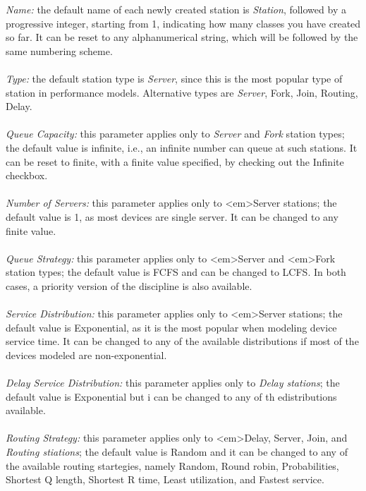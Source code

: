 \begin{description*}
\begin{center}
\end{center}
\emph{Name:}
the default name of each newly created station is \emph{Station}, followed by a progressive integer, starting from 1, indicating how many classes you have created so far. It can be reset to any alphanumerical string, which will be followed by the same numbering scheme.\\\\
\emph{Type:}
the default station type is \emph{Server}, since this is the most popular type of station in performance models. Alternative types are \emph{Server}, Fork, Join, Routing, Delay.\\\\
\emph{Queue Capacity:}
this parameter applies only to \emph{Server} and \emph{Fork} station types; the default value is infinite, i.e., an infinite number can queue at such stations. It can be reset to finite, with a finite value specified, by checking out the Infinite checkbox.\\\\
\emph{Number of Servers:}
this parameter applies only to <em>Server stations; the default value is 1, as most devices are single server. It can be changed to any finite value.\\\\
\emph{Queue Strategy:}
this parameter applies only to <em>Server and <em>Fork station types; the default value is FCFS and can be changed to LCFS. In both cases, a priority version of the discipline is also available.\\\\
\emph{Service Distribution:}
this parameter applies only to <em>Server stations; the default value is Exponential, as it is the most popular when modeling device service time. It can be changed to any of the available distributions if most of the devices modeled are non-exponential.\\\\
\emph{Delay Service Distribution:}
this parameter applies only to \emph{Delay stations}; the default value is Exponential but i can be changed to any of th edistributions available.\\\\
\emph{Routing Strategy:}
this parameter applies only to <em>Delay, Server, Join, and \emph{Routing stiations}; the default value is Random and it can be changed to any of the available routing startegies, namely Random, Round robin, Probabilities, Shortest Q length, Shortest R time, Least utilization, and Fastest service.\\\\

\end{description*}

